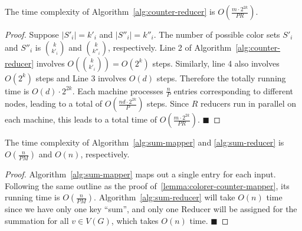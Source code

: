 \begin{lemma}
\label{lemma:counter-reducer}
The time complexity of Algorithm~\ref{alg:counter-reducer} is $O(\frac{m \cdot 2^{2k}}{PR})$.
\end{lemma}
\begin{proof}
Suppose $|S'_i| = k'_i$ and $|S''_i| = k''_i$. The number of possible
color sets $S'_i$ and $S''_i$ is $k \choose k'_i$ and $k \choose k''_i$,
respectively. Line 2 of Algorithm~\ref{alg:counter-reducer} involves $O({k \choose
k'_i}) = O(2^k)$ steps.  Similarly, line 4 also involves $O(2^k)$ steps and
Line 3 involves $O(d)$ steps.
Therefore the totally running time is $O(d) \cdot 2^{2k}$.
Each machine processes $\frac{n}{P}$ entries corresponding to different nodes,
leading to a total of $O(\frac{nd \cdot 2^{2k}}{P})$ steps. Since $R$ reducers
run in parallel on each machine, this leads to a total time of $O(\frac{m \cdot 2^{2k}}{PR})$.
\hfill\ensuremath{\blacksquare}
\end{proof}

\begin{lemma}
\label{lemma:sum}
The time complexity of Algorithm~\ref{alg:sum-mapper} and \ref{alg:sum-reducer}
is $O(\frac{n}{PM})$ and $O(n)$, respectively.
\end{lemma}
\begin{proof}
Algorithm~\ref{alg:sum-mapper} maps out a single entry for each input. Following the
same outline as the proof of~\ref{lemma:colorer-counter-mapper}, its running time is
$O(\frac{n}{PM})$.  Algorithm~\ref{alg:sum-reducer} will take $O(n)$ time since
we have only one key ``sum'', and only one Reducer will be assigned for the
summation for all $v \in V(G)$, which takes $O(n)$ time. 
\hfill\ensuremath{\blacksquare}
\end{proof}

